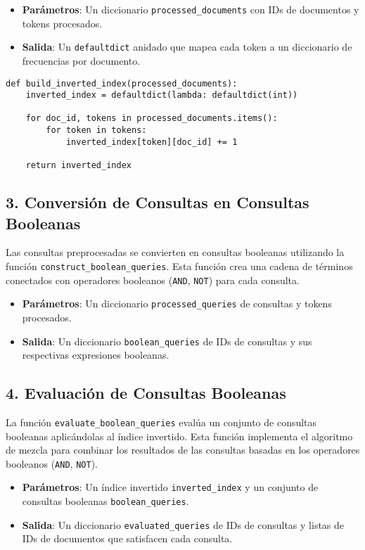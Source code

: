 \documentclass[11pt,english]{article}
\theoremstyle{plain}
\begin{document}
\begin{itemize}
    \item \textbf{Parámetros}: Un diccionario \texttt{processed\_documents} con IDs de documentos y tokens procesados.
    \item \textbf{Salida}: Un \texttt{defaultdict} anidado que mapea cada token a un diccionario de frecuencias por documento.
\end{itemize}

\begin{verbatim}
def build_inverted_index(processed_documents):
    inverted_index = defaultdict(lambda: defaultdict(int))
    
    for doc_id, tokens in processed_documents.items():
        for token in tokens:
            inverted_index[token][doc_id] += 1
    
    return inverted_index
\end{verbatim}

\subsection*{3. Conversión de Consultas en Consultas Booleanas}

Las consultas preprocesadas se convierten en consultas booleanas utilizando la función \texttt{construct\_boolean\_queries}. Esta función crea una cadena de términos conectados con operadores booleanos (\texttt{AND}, \texttt{NOT}) para cada consulta.

\begin{itemize}
    \item \textbf{Parámetros}: Un diccionario \texttt{processed\_queries} de consultas y tokens procesados.
    \item \textbf{Salida}: Un diccionario \texttt{boolean\_queries} de IDs de consultas y sus respectivas expresiones booleanas.
\end{itemize}

\subsection*{4. Evaluación de Consultas Booleanas}

La función \texttt{evaluate\_boolean\_queries} evalúa un conjunto de consultas booleanas aplicándolas al índice invertido. Esta función implementa el algoritmo de mezcla para combinar los resultados de las consultas basadas en los operadores booleanos (\texttt{AND}, \texttt{NOT}).

\begin{itemize}
    \item \textbf{Parámetros}: Un índice invertido \texttt{inverted\_index} y un conjunto de consultas booleanas \texttt{boolean\_queries}.
    \item \textbf{Salida}: Un diccionario \texttt{evaluated\_queries} de IDs de consultas y listas de IDs de documentos que satisfacen cada consulta.
\end{itemize}
\end{document}
